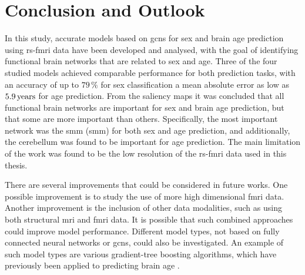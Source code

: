 

\chapter{Conclusion and Outlook}

In this study, accurate models based on \acrshort{gcn}s for sex and brain age prediction using \acrshort{rs-fmri} data have been developed and analysed, with the goal of identifying functional brain networks that are related to sex and age. Three of the four studied models achieved comparable performance for both prediction tasks, with an accuracy of up to $79\,\%$ for sex classification a mean absolute error as low as $5.9\rm\,years$ for age prediction. From the saliency maps it was concluded that all functional brain networks are important for sex and brain age prediction, but that some are more important than others. Specifically, the most important network was the \acrlong{smm} (\acrshort{smm}) for both sex and age prediction, and additionally, the cerebellum was found to be important for age prediction. The main limitation of the work was found to be the low resolution of the \acrshort{rs-fmri} data used in this thesis.

There are several improvements that could be considered in future works. One possible improvement is to study the use of more high dimensional \acrshort{fmri} data. Another improvement is the inclusion of other data modalities, such as using both structural \acrshort{mri} and \acrshort{fmri} data. It is possible that such combined approaches could improve model performance. Different model types, not based on fully connected neural networks or \acrshort{gcn}s, could also be investigated. An example of such model types are various gradient-tree boosting algorithms, which have previously been applied to predicting brain age \cite{kaufmann}.


